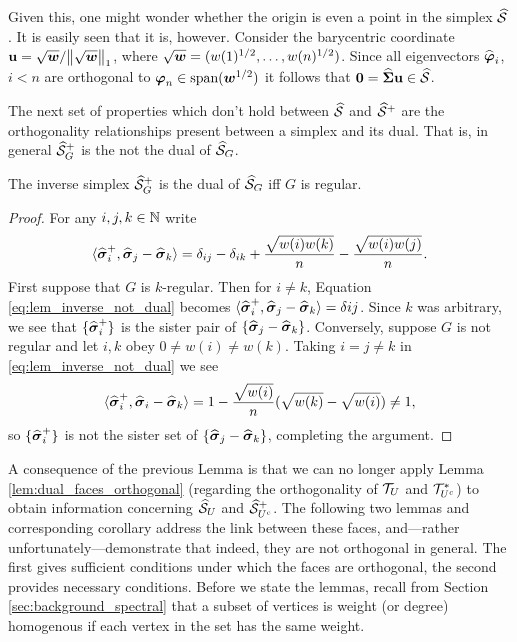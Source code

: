Given this, one might wonder whether the origin is even a point in the simplex $\widehat{\mathcal{S}}$. It is easily seen that it is, however. Consider the barycentric coordinate $\vb{u} = \sqrt{\vb*{w}}/\norm{\sqrt{\vb*{w}}}_1$, where $\sqrt{\vb*{w}}=(w(1)^{1/2}, \dots, w(n)^{1/2})$. Since all eigenvectors $\widehat{\vb*{\varphi}}_i$, $i<n$ are orthogonal to $\vb*{\varphi}_n \in\textnormal{span}(\vb*{w}^{1/2})$ it follows that $\vb{0} = \widehat{\boldsymbol{\Sigma}}\vb{u}\in\widehat{\mathcal{S}}$. 

The next set of properties which don't hold between $\widehat{\mathcal{S}}$ and $\widehat{\mathcal{S}}^+$ are the orthogonality relationships present between a simplex and its dual. That is, in general $\widehat{\mathcal{S}}^+_G$ is the not the dual of $\widehat{\mathcal{S}}_G$. 

\begin{lemma}
	\label{lem:inverse_not_dual}
	The inverse simplex $\widehat{\mathcal{S}}_G^+$ is the dual of $\widehat{\mathcal{S}}_G$ iff $G$ is regular. 
\end{lemma}
\begin{proof}
	For any $i,j,k\in\mathbb{N}$ write 
	\begin{equation}
	\label{eq:lem_inverse_not_dual}
	\langle \widehat{\vb*{\sigma}}_i^+,\widehat{\vb*{\sigma}}_j-\widehat{\vb*{\sigma}}_k\rangle = \delta_{ij} - \delta_{ik} + \frac{\sqrt{w(i)w(k)}}{n} - \frac{\sqrt{w(i)w(j)}}{n}.
	\end{equation}
	First suppose that $G$ is $k$-regular. Then for $i\neq k$, Equation \eqref{eq:lem_inverse_not_dual} becomes $\langle \widehat{\vb*{\sigma}}_i^+,\widehat{\vb*{\sigma}}_j-\widehat{\vb*{\sigma}}_k\rangle = \delta{ij}$. Since $k$ was arbitrary, we see that $\{\widehat{\vb*{\sigma}}_i^+\}$ is the sister pair of $\{\widehat{\vb*{\sigma}}_j-\widehat{\vb*{\sigma}}_k\}$. Conversely, suppose $G$ is not regular and let $i,k$ obey $0\neq w(i)\neq w(k)$. Taking $i=j\neq k$ in \eqref{eq:lem_inverse_not_dual} we see 
	\[\langle \widehat{\vb*{\sigma}}_i^+,\widehat{\vb*{\sigma}}_i-\widehat{\vb*{\sigma}}_k\rangle = 1 - \frac{\sqrt{w(i)}}{n}(\sqrt{w(k)}-\sqrt{w(i)})\neq 1,\]
	so $\{\widehat{\vb*{\sigma}}_i^+\}$ is not the sister set of $\{\widehat{\vb*{\sigma}}_j-\widehat{\vb*{\sigma}}_k\}$, completing the argument. 
\end{proof}

A consequence of the previous Lemma is that we can no longer apply Lemma \ref{lem:dual_faces_orthogonal} (regarding the orthogonality of $\mathcal{T}_U$ and $\mathcal{T}_{U^c}^*$) to obtain information concerning $\widehat{\mathcal{S}}_U$ and $\widehat{\mathcal{S}}_{U^c}^+$. The following two lemmas and corresponding corollary address the link between these faces, and---rather unfortunately---demonstrate that indeed, they are not orthogonal in general. 
The first gives sufficient conditions under which the faces are orthogonal, the second provides necessary conditions. 
Before we state the lemmas, recall from Section \ref{sec:background_spectral} that a subset of vertices is weight  (or degree) homogenous if each vertex in the set has the same weight. 

